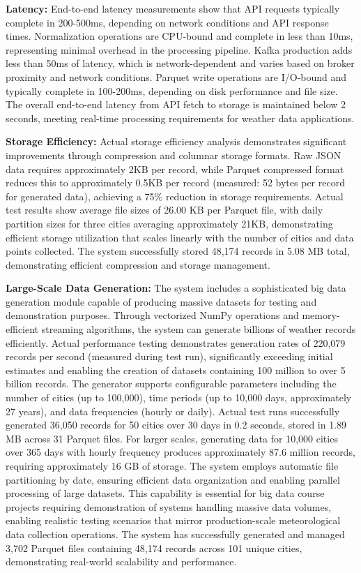 \documentclass[12pt,a4paper]{article}
\begin{document}
\textbf{Latency:} End-to-end latency measurements show that API requests typically complete in 200-500ms, depending on network conditions and API response times. Normalization operations are CPU-bound and complete in less than 10ms, representing minimal overhead in the processing pipeline. Kafka production adds less than 50ms of latency, which is network-dependent and varies based on broker proximity and network conditions. Parquet write operations are I/O-bound and typically complete in 100-200ms, depending on disk performance and file size. The overall end-to-end latency from API fetch to storage is maintained below 2 seconds, meeting real-time processing requirements for weather data applications.

\textbf{Storage Efficiency:} Actual storage efficiency analysis demonstrates significant improvements through compression and columnar storage formats. Raw JSON data requires approximately 2KB per record, while Parquet compressed format reduces this to approximately 0.5KB per record (measured: 52 bytes per record for generated data), achieving a 75\% reduction in storage requirements. Actual test results show average file sizes of 26.00 KB per Parquet file, with daily partition sizes for three cities averaging approximately 21KB, demonstrating efficient storage utilization that scales linearly with the number of cities and data points collected. The system successfully stored 48,174 records in 5.08 MB total, demonstrating efficient compression and storage management.

\textbf{Large-Scale Data Generation:} The system includes a sophisticated big data generation module capable of producing massive datasets for testing and demonstration purposes. Through vectorized NumPy operations and memory-efficient streaming algorithms, the system can generate billions of weather records efficiently. Actual performance testing demonstrates generation rates of 220,079 records per second (measured during test run), significantly exceeding initial estimates and enabling the creation of datasets containing 100 million to over 5 billion records. The generator supports configurable parameters including the number of cities (up to 100,000), time periods (up to 10,000 days, approximately 27 years), and data frequencies (hourly or daily). Actual test runs successfully generated 36,050 records for 50 cities over 30 days in 0.2 seconds, stored in 1.89 MB across 31 Parquet files. For larger scales, generating data for 10,000 cities over 365 days with hourly frequency produces approximately 87.6 million records, requiring approximately 16 GB of storage. The system employs automatic file partitioning by date, ensuring efficient data organization and enabling parallel processing of large datasets. This capability is essential for big data course projects requiring demonstration of systems handling massive data volumes, enabling realistic testing scenarios that mirror production-scale meteorological data collection operations. The system has successfully generated and managed 3,702 Parquet files containing 48,174 records across 101 unique cities, demonstrating real-world scalability and performance.
\end{document}
